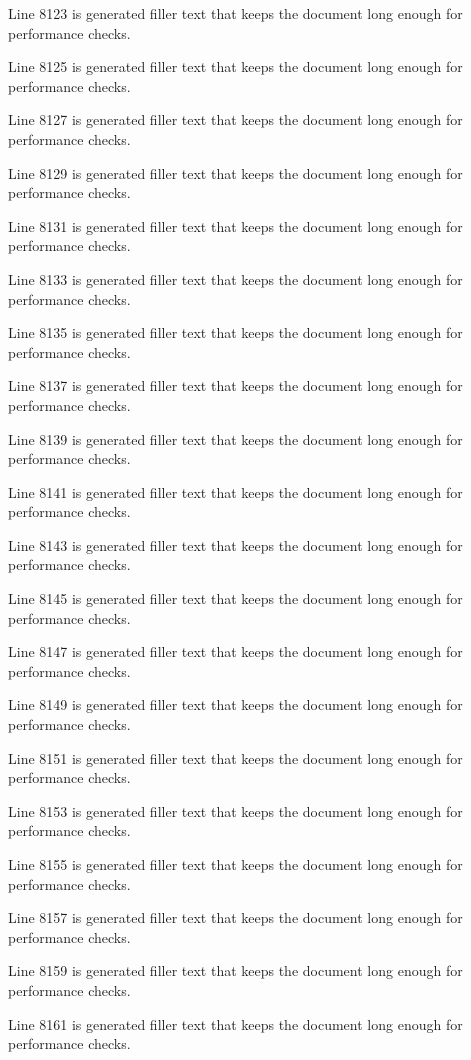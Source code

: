 Line 8123 is generated filler text that keeps the document long enough for performance checks.

Line 8125 is generated filler text that keeps the document long enough for performance checks.

Line 8127 is generated filler text that keeps the document long enough for performance checks.

Line 8129 is generated filler text that keeps the document long enough for performance checks.

Line 8131 is generated filler text that keeps the document long enough for performance checks.

Line 8133 is generated filler text that keeps the document long enough for performance checks.

Line 8135 is generated filler text that keeps the document long enough for performance checks.

Line 8137 is generated filler text that keeps the document long enough for performance checks.

Line 8139 is generated filler text that keeps the document long enough for performance checks.

Line 8141 is generated filler text that keeps the document long enough for performance checks.

Line 8143 is generated filler text that keeps the document long enough for performance checks.

Line 8145 is generated filler text that keeps the document long enough for performance checks.

Line 8147 is generated filler text that keeps the document long enough for performance checks.

Line 8149 is generated filler text that keeps the document long enough for performance checks.

Line 8151 is generated filler text that keeps the document long enough for performance checks.

Line 8153 is generated filler text that keeps the document long enough for performance checks.

Line 8155 is generated filler text that keeps the document long enough for performance checks.

Line 8157 is generated filler text that keeps the document long enough for performance checks.

Line 8159 is generated filler text that keeps the document long enough for performance checks.

Line 8161 is generated filler text that keeps the document long enough for performance checks.

